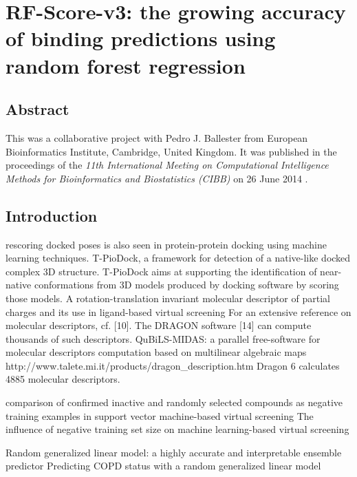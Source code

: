 \chapter{RF-Score-v3: the growing accuracy of binding predictions using random forest regression}

\section{Abstract}

This was a collaborative project with Pedro J. Ballester from European Bioinformatics Institute, Cambridge, United Kingdom. It was published in the proceedings of the \textit{11th International Meeting on Computational Intelligence Methods for Bioinformatics and Biostatistics (CIBB)} on 26 June 2014 \citep{1433}.


\section{Introduction}

\citep{1399} rescoring docked poses is also seen in protein-protein docking using machine learning techniques. T-PioDock, a framework for detection of a native-like docked complex 3D structure. T-PioDock aims at supporting the identification of near-native conformations from 3D models produced by docking software by scoring those models.
\citep{1389} A rotation-translation invariant molecular descriptor of partial charges and its use in ligand-based virtual screening
\citep{1389} For an extensive reference on molecular descriptors, cf. [10]. The DRAGON software [14] can compute thousands of such descriptors.
\citep{1400} QuBiLS-MIDAS: a parallel free-software for molecular descriptors computation based on multilinear algebraic maps
http://www.talete.mi.it/products/dragon_description.htm Dragon 6 calculates 4885 molecular descriptors. 

\citep{1423} comparison of confirmed inactive and randomly selected compounds as negative training examples in support vector machine-based virtual screening
\citep{1404} The influence of negative training set size on machine learning-based virtual screening

\citep{1377} Random generalized linear model: a highly accurate and interpretable ensemble predictor
\citep{1418} Predicting COPD status with a random generalized linear model

